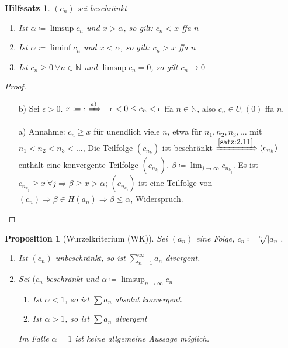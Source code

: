 \documentclass[titlepage,ngerman,a4paper,headsepline,DIV15,halfparskip*,14pt]{scrartcl}
\newcommand{\N}{\mathbb{N}}
\theoremstyle{dotless}
\newtheorem{prop}[satz]{Proposition}
\newtheorem*{hilfssatz}{Hilfssatz}
\begin{document}
\begin{hilfssatz}
	$(c_{n})$ sei beschränkt
	\begin{enumerate}
		\item Ist $\alpha \coloneqq \limsup c_{n}$ und $x > \alpha$, so gilt: $c_{n} < x$ ffa $n$
		\item Ist $\alpha \coloneqq \liminf c_{n}$ und $x < \alpha$, so gilt: $c_{n} > x$ ffa $n$
		\item Ist $c_{n} \geq 0 ~\forall n \in \N$ und $\limsup c_{n} = 0$, so gilt $c_{n} \rightarrow 0$
	\end{enumerate}
\end{hilfssatz}

\begin{proof} ~\
	\begin{enumerate}
		\item[b)] Sei $\epsilon > 0$. $x \coloneq \epsilon \xRightarrow[]{a)} -\epsilon < 0 \leq c_{n} < \epsilon$ ffa $n \in \N$, also $c_{n} \in U_{\epsilon}(0)$ ffa $n$.
		\item[a)] Annahme: $c_{n} \geq x$ für unendlich viele $n$, etwa für $n_{1}, n_{2}, n_{3}, \dotsc$ mit $n_{1} < n_{2} < n_{3} < \dotsc$, Die Teilfolge $(c_{n_{k}})$ ist beschränkt $\xRightarrow[]{\ref{satz:2.11}} (c_{n_{k}})$ enthält eine konvergente Teilfolge $(c_{n_{k_{j}}})$. $\beta \coloneqq \lim_{j\rightarrow \infty} c_{n_{k_{j}}}$. Es ist $c_{n_{k_{j}}} \geq x ~\forall j \Rightarrow \beta \geq x > \alpha$; $(c_{n_{k_{j}}})$ ist eine Teilfolge von $(c_{n}) \Rightarrow \beta \in H(a_{n}) \Rightarrow \beta \leq \alpha$, Widerspruch.
	\end{enumerate}	
\end{proof}

\begin{prop}[Wurzelkriterium (WK)] \label{prop:3.6-Wurzelkriterium}
	Sei $(a_{n})$ eine Folge, $c_{n} \coloneqq \sqrt[n]{|a_{n}|}$.
	\begin{enumerate}
		\item Ist $(c_{n})$ unbeschränkt, so ist $\sum_{n=1}^{\infty} a_{n}$ divergent.
		\item Sei $(c_{n}$ beschränkt und $\alpha \coloneqq \limsup_{n \rightarrow \infty} c_{n}$
			\begin{enumerate}
				\item Ist $\alpha < 1$, so ist $\sum a_{n}$ absolut konvergent.
				\item Ist $\alpha > 1$, so ist $\sum a_{n}$ divergent
			\end{enumerate}
			Im Falle $\alpha = 1$ ist keine allgemeine Aussage möglich.
	\end{enumerate}
\end{prop}
\end{document}
